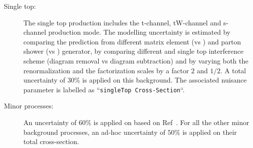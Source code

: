 \begin{description}
\item[Single top:]  The single top production includes the t-channel, tW-channel and s-channel production mode.
The modelling uncertainty is estimated by comparing the prediction from different matrix element (\powhegs vs \mgamc) and parton shower (\pythiaeight vs \herwigseven) generator, by comparing different \ttbar and single top interference scheme (diagram removal vs diagram subtraction) and by varying both the renormalization and the factorization scales by a factor $2$ and $1/2$.
A total uncertainty of $30\%$ is applied on this background.
The associated nuisance parameter is labelled as ``\texttt{singleTop Cross-Section}``.

\item[Minor processes:] An uncertainty of 60\% is applied on \Vjets based on Ref~\cite{Alwall:2007fs}.
For all the other minor background processes, an ad-hoc uncertainty of $50\%$ is applied on their total cross-section.


\end{description}



